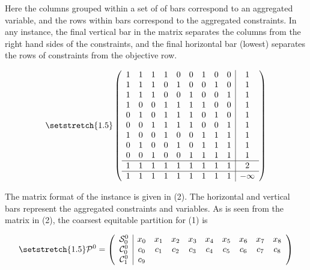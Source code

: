 \documentclass[11pt]{article} %
\newcommand{\cC}{{\cal C}}
\newcommand{\cS}{{\cal S}}
\begin{document}
	Here the columns grouped within a set of of bars correspond to an aggregated variable, and the rows within bars correspond to the aggregated constraints.  In any instance, the final vertical bar in the matrix separates the columns from the right hand sides of the constraints, and the final horizontal bar (lowest) separates the rows of constraints from the objective row.
	
\begin{equation}\setstretch{1.5}
 	\begin{pmatrix}
 		\begin{array}{ccccccccc|c}
 			1 & 1 & 1 & 1 & 0 & 0 & 1 & 0 & 0 & 1 \\ 
 			1 & 1 & 1 & 0 & 1 & 0 & 0 & 1 & 0 &  1 \\ 
 			1 & 1 & 1 & 0 & 0 & 1 & 0 & 0 & 1 & 1 \\ 
 			1 & 0 & 0 & 1 & 1 & 1 & 1 & 0 & 0 & 1 \\ 
 			0 & 1 & 0 & 1 & 1 & 1 & 0 & 1 & 0 & 1 \\ 
 			0 & 0 & 1 & 1 & 1 & 1 & 0 & 0 & 1 & 1 \\ 
 			1 & 0 & 0 & 1 & 0 & 0 & 1 & 1 & 1 & 1 \\ 
 			0 & 1 & 0 & 0 & 1 & 0 & 1 & 1 & 1 & 1 \\ 
 			0 & 0 & 1 & 0 & 0 & 1 & 1 & 1 & 1 & 1 \\ 
 			\hline
 			1 & 1 & 1 & 1 & 1 & 1 & 1 & 1 & 1 & 2 \\ 
 			\hline
 			1 & 1 & 1 & 1 & 1 & 1 & 1 & 1 & 1 & -\infty
 		\end{array}
 	\end{pmatrix}
 \end{equation}
 
	 The matrix format of the instance is given in (2).  The horizontal and vertical bars represent the aggregated constraints and variables. As is seen from the matrix in (2), the coarsest equitable partition for (1) is
	 
	 \begin{equation}\setstretch{1.5}
	 	\mathcal{P}^0 = 
	 	\begin{pmatrix} 
	 	\begin{array}{c|ccccccccc}
	 	\cS_0^0 & x_0 & x_1 & x_2 & x_3 & x_4 & x_5 & x_6 & x_7 & x_8 \\
	 	\cC_0^0 & c_0 & c_1 & c_2 & c_3 & c_4 & c_5 & c_6 & c_7 & c_8 \\
	 	\cC_1^0 & c_9
	 	\end{array}
	 	\end{pmatrix} 
	 \end{equation}
	 
\end{document}
